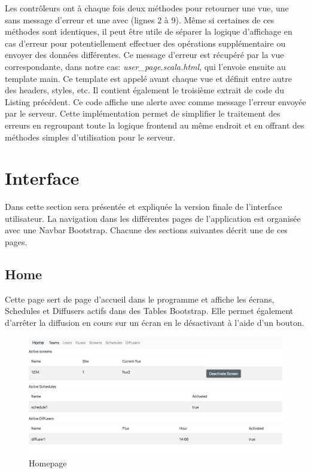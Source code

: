 \documentclass[french]{article}
\begin{document}
Les contrôleurs ont à chaque fois deux méthodes pour retourner une vue, une sans message d'erreur et une avec (lignes 2 à 9). Même si certaines de ces méthodes sont identiques, il peut être utile de séparer la logique d'affichage en cas d'erreur pour potentiellement effectuer des opérations supplémentaire ou envoyer des données différentes. \newline
Ce message d'erreur est récupéré par la vue correspondante, dans notre cas: \textit{user\_page.scala.html}, qui l'envoie ensuite au template main. Ce template est appelé avant chaque vue et définit entre autre des headers, styles, etc. Il contient également le troisième extrait de code du Listing précédent. Ce code affiche une alerte avec comme message l'erreur envoyée par le serveur. Cette implémentation permet de simplifier le traitement des erreurs en regroupant toute la logique frontend au même endroit et en offrant des méthodes simples d'utilisation pour le serveur.

\newpage
\section{Interface}

Dans cette section sera présentée et expliquée la version finale de l'interface utilisateur. \newline
La navigation dans les différentes pages de l'application est organisée avec une Navbar Bootstrap. Chacune des sections suivantes décrit une de ces pages.  

\subsection{Home}

Cette page sert de page d'accueil dans le programme et affiche les écrans, Schedules et Diffusers actifs dans des Tables Bootstrap. Elle permet également d'arrêter la diffusion en cours sur un écran en le désactivant à l'aide d'un bouton.

\begin{figure}[h]
	\centering	
	\includegraphics[width=0.8\linewidth]{interface/homepage.png}%
	\caption{Homepage}
\end{figure}
\end{document}
